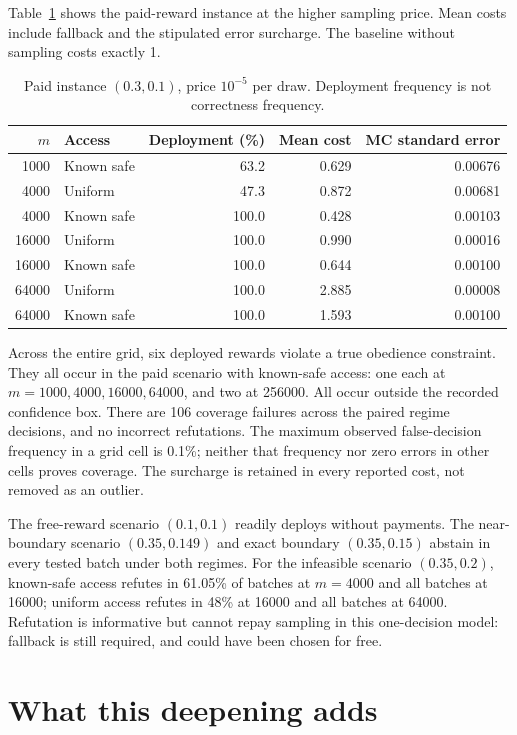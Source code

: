 \documentclass[11pt,a4paper]{article}
\begin{document}
Table~\ref{tab:paid} shows the paid-reward instance at the higher sampling
price. Mean costs include fallback and the stipulated error surcharge.
The baseline without sampling costs exactly 1.

\begin{table}[ht]
\centering\small
\begin{tabular}{r l r r r}
\toprule
\(m\)&Access&Deployment (\%)&Mean cost&MC standard error\\
\midrule
1000&Known safe&63.2&0.629&0.00676\\
4000&Uniform&47.3&0.872&0.00681\\
4000&Known safe&100.0&0.428&0.00103\\
16000&Uniform&100.0&0.990&0.00016\\
16000&Known safe&100.0&0.644&0.00100\\
64000&Uniform&100.0&2.885&0.00008\\
64000&Known safe&100.0&1.593&0.00100\\
\bottomrule
\end{tabular}
\caption{Paid instance \((0.3,0.1)\), price \(10^{-5}\) per draw.
Deployment frequency is not correctness frequency.}\label{tab:paid}
\end{table}

Across the entire grid, six deployed rewards violate a true obedience
constraint. They all occur in the paid scenario with known-safe access:
one each at \(m=1000,4000,16000,64000\), and two at 256000.
All occur outside the recorded confidence box. There are 106 coverage
failures across the paired regime decisions, and no incorrect refutations.
The maximum observed false-decision frequency in a grid cell is 0.1\%;
neither that frequency nor zero errors in other cells proves coverage.
The surcharge is retained in every reported cost, not removed as an outlier.

The free-reward scenario \((0.1,0.1)\) readily deploys without payments.
The near-boundary scenario \((0.35,0.149)\) and exact boundary
\((0.35,0.15)\) abstain in every tested batch under both regimes.
For the infeasible scenario \((0.35,0.2)\), known-safe access refutes in
61.05\% of batches at \(m=4000\) and all batches at 16000; uniform
access refutes in 48\% at 16000 and all batches at 64000.
Refutation is informative but cannot repay sampling in this one-decision
model: fallback is still required, and could have been chosen for free.

\section{What this deepening adds}
\end{document}
